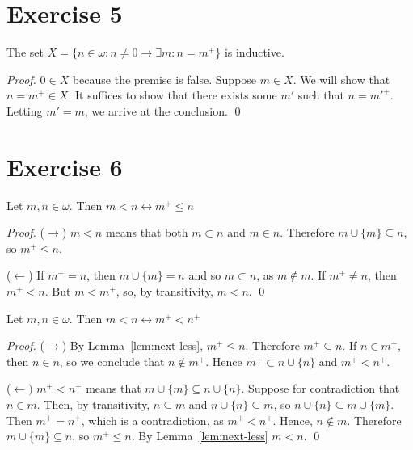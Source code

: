 \documentclass[11pt]{llncs}
\begin{document}
\section*{Exercise 5}
\begin{lemma}
  The set $X = \{n \in \omega: n \neq 0 \rightarrow \exists m: n = m^+\}$
  is inductive.
\end{lemma}
\begin{proof}
  $0 \in X$ because the premise is false.
  Suppose $m \in X$. We will show that $n = m^+ \in X$.
  It suffices to show that there exists some $m'$ such that $n = m'^+$.
  Letting $m' = m$, we arrive at the conclusion.
  \qed
\end{proof}

\section*{Exercise 6}
\begin{lemma}\label{lem:next-less}
  Let $m, n \in \omega$. Then
  $m < n \leftrightarrow m^+ \leq n$
\end{lemma}
\begin{proof}
  \item{($\rightarrow$)}
  $m < n$ means that both $m \subset n$ and $m \in n$.
  Therefore $m \cup \{m\} \subseteq n$, so $m^+ \leq n$.
  \item{($\leftarrow$)}
  If $m^+ = n$, then $m \cup \{m\} = n$ and so $m \subset n$, as $m \not\in m$.
  If $m^+ \neq n$, then $m^+ < n$. But $m < m^+$, so, by transitivity, $m < n$.
  \qed
\end{proof}

\begin{lemma}\label{lem:less-than-homo}
  Let $m, n \in \omega$. Then
  $m < n \leftrightarrow m^+ < n^+$
\end{lemma}
\begin{proof}
  \item{($\rightarrow$)}
  By Lemma~\ref{lem:next-less}, $m^+ \leq n$. Therefore $m^+ \subseteq n$.
  If $n \in m^+$, then $n \in n$, so we conclude that $n \not\in m^+$.
  Hence $m^+ \subset n \cup \{n\}$ and $m^+ < n^+$.

  \item{($\leftarrow)$}
  $m^+ < n^+$ means that $m \cup \{m\} \subseteq n \cup \{n\}$.
  Suppose for contradiction that $n \in m$. Then, by transitivity,
  $n \subseteq m$ and
  $n \cup \{n\} \subseteq m$, so $n \cup \{n\} \subseteq m \cup \{m\}$.
  Then $m^+ = n^+$, which is a contradiction, as $m^+ < n^+$.
  Hence, $n \not\in m$. Therefore $m \cup \{m\} \subseteq n$, so $m^+ \leq n$.
  By Lemma~\ref{lem:next-less} $m < n$.
  \qed
\end{proof}
\end{document}
